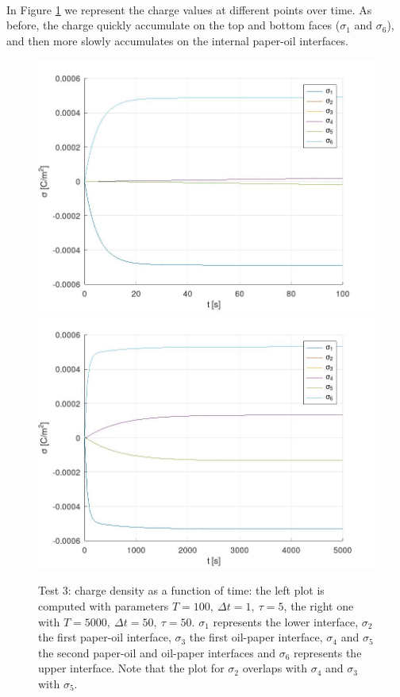 \documentclass{Configuration_Files/PoliMi3i_thesis}
\begin{document}
\\In Figure \ref{fig: 3.4} we represent the charge values at different points over time. As before, the charge quickly accumulate on the top and bottom faces ($\sigma_1$ and $\sigma_6$), and then more slowly accumulates on the internal paper-oil interfaces.
\begin{figure}[h!]
    \centering
   \includegraphics[scale=0.2]{Images/3.rho_time_fast.jpeg}
   \includegraphics[scale=0.2]{Images/3.rho_time.jpeg}
    \caption {Test 3: charge density as a function of time: the left plot is computed with parameters $T=100,\ \Delta t=1,\ \tau=5$, the right one with $T=5000,\ \Delta t=50,\ \tau=50$. $\sigma_1$ represents the lower interface, $\sigma_2$ the first paper-oil interface, $\sigma_3$ the first oil-paper interface, $\sigma_4$ and $\sigma_5$ the second paper-oil and oil-paper interfaces and $\sigma_6$ represents the upper interface. Note that the plot for $\sigma_2$ overlaps with $\sigma_4$ and $\sigma_3$ with $\sigma_5$.}
    \label{fig: 3.4}
\end{figure}
\end{document}
